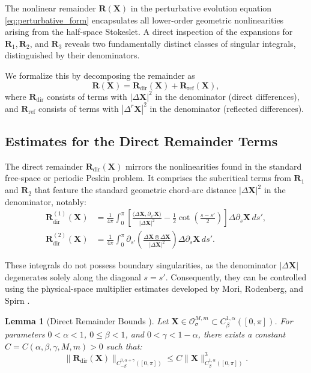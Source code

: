 \documentclass{amsart}
\newtheorem{lemma}[theorem]{Lemma}
\begin{document}
The nonlinear remainder $\mathbf{R}(\mathbf{X})$ in the perturbative evolution equation \eqref{eq:perturbative_form} encapsulates all lower-order geometric nonlinearities arising from the half-space Stokeslet. A direct inspection of the expansions for $\mathbf{R}_1, \mathbf{R}_2$, and $\mathbf{R}_3$ reveals two fundamentally distinct classes of singular integrals, distinguished by their denominators.

We formalize this by decomposing the remainder as 
\begin{equation}
\mathbf{R}(\mathbf{X}) = \mathbf{R}_{\mathrm{dir}}(\mathbf{X}) + \mathbf{R}_{\mathrm{ref}}(\mathbf{X}),
\end{equation}
where $\mathbf{R}_{\mathrm{dir}}$ consists of terms with $|\Delta \mathbf{X}|^2$ in the denominator (direct differences), and $\mathbf{R}_{\mathrm{ref}}$ consists of terms with $|\Delta^r \mathbf{X}|^2$ in the denominator (reflected differences).

\subsection{Estimates for the Direct Remainder Terms}

The direct remainder $\mathbf{R}_{\mathrm{dir}}(\mathbf{X})$ mirrors the nonlinearities found in the standard free-space or periodic Peskin problem. It comprises the subcritical terms from $\mathbf{R}_1$ and $\mathbf{R}_2$ that feature the standard geometric chord-arc distance $|\Delta \mathbf{X}|^2$ in the denominator, notably:
\begin{align*}
\mathbf{R}_{\mathrm{dir}}^{(1)}(\mathbf{X}) &= \frac{1}{4\pi} \int_{0}^{\pi} \left[ \frac{\langle \Delta \mathbf{X}, \partial_{s'} \mathbf{X} \rangle}{|\Delta \mathbf{X}|^2} - \frac{1}{2}\cot\left(\frac{s-s'}{2}\right) \right] \Delta \partial_s \mathbf{X}\, ds', \\
\mathbf{R}_{\mathrm{dir}}^{(2)}(\mathbf{X}) &= \frac{1}{4\pi}\int_{0}^{\pi} \partial_{s'}\left( \frac{\Delta \mathbf{X}\otimes \Delta \mathbf{X}}{|\Delta \mathbf{X}|^2} \right) \Delta \partial_s \mathbf{X}\, ds'.
\end{align*}

These integrals do not possess boundary singularities, as the denominator $|\Delta \mathbf{X}|$ degenerates solely along the diagonal $s=s'$. Consequently, they can be controlled using the physical-space multiplier estimates developed by Mori, Rodenberg, and Spirn \cite{mori2019well}.

\begin{lemma}[Direct Remainder Bounds \cite{mori2019well}]\label{lem:direct_bounds}
Let $\mathbf{X} \in \mathcal{O}^{M,m}_\sigma \subset C^{1,\alpha}_\beta([0,\pi])$. For parameters $0 < \alpha < 1$, $0 \le \beta < 1$, and $0 < \gamma < 1-\alpha$, there exists a constant $C = C(\alpha, \beta, \gamma, M, m) > 0$ such that:
\[
\|\mathbf{R}_{\mathrm{dir}}(\mathbf{X})\|_{C^{0,\alpha+\gamma}_{-\beta}([0,\pi])} \le C \|\mathbf{X}\|_{C^{1,\alpha}_\beta([0,\pi])}^3.
\]
\end{lemma}
\end{document}
